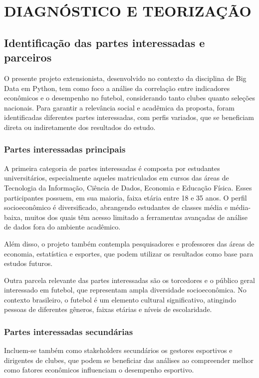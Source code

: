 \documentclass[12pt, a4paper, brazil]{article}
\begin{document}
\newpage
\tableofcontents
\newpage

\section{DIAGNÓSTICO E TEORIZAÇÃO}

\subsection{Identificação das partes interessadas e parceiros}
O presente projeto extensionista, desenvolvido no contexto da disciplina de Big Data em Python, tem como foco a análise da correlação entre indicadores econômicos e o desempenho no futebol, considerando tanto clubes quanto seleções nacionais. Para garantir a relevância social e acadêmica da proposta, foram identificadas diferentes partes interessadas, com perfis variados, que se beneficiam direta ou indiretamente dos resultados do estudo.

\subsubsection{Partes interessadas principais}
A primeira categoria de partes interessadas é composta por estudantes universitários, especialmente aqueles matriculados em cursos das áreas de Tecnologia da Informação, Ciência de Dados, Economia e Educação Física. Esses participantes possuem, em sua maioria, faixa etária entre 18 e 35 anos. O perfil socioeconômico é diversificado, abrangendo estudantes de classes média e média-baixa, muitos dos quais têm acesso limitado a ferramentas avançadas de análise de dados fora do ambiente acadêmico.

Além disso, o projeto também contempla pesquisadores e professores das áreas de economia, estatística e esportes, que podem utilizar os resultados como base para estudos futuros.

Outra parcela relevante das partes interessadas são os torcedores e o público geral interessado em futebol, que representam ampla diversidade socioeconômica. No contexto brasileiro, o futebol é um elemento cultural significativo, atingindo pessoas de diferentes gêneros, faixas etárias e níveis de escolaridade.

\subsubsection{Partes interessadas secundárias}
Incluem-se também como stakeholders secundários os gestores esportivos e dirigentes de clubes, que podem se beneficiar das análises ao compreender melhor como fatores econômicos influenciam o desempenho esportivo.
\end{document}
